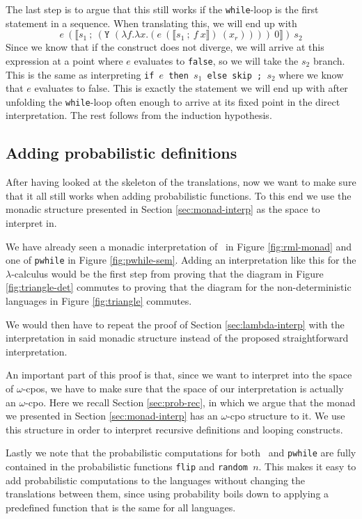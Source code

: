 \documentclass[11pt, leqno, titlepage]{article}
\theoremstyle{definition}
\begin{document}
The last step is to argue that this still works if the \texttt{while}-loop is the
first statement in a sequence. When translating this, we will end up with 
$$e~(\llbracket s_1~;~(\texttt{Y }(\lambda f.\lambda x.(e~(\llbracket
s_1~;~f~x\rrbracket) ~(x_r))))~0 \rrbracket) ~s_2 $$
Since we know that if the construct does not diverge, we will arrive at this
expression at a point where $e$ evaluates to \texttt{false}, so we will take the
$s_2$ branch. This is the same as interpreting \texttt{if $e$ then $s_1$ else skip ;
  $s_2$} where we know that $e$ evaluates to false. This is exactly the statement we
will end up with after unfolding the \texttt{while}-loop often enough to arrive at
its fixed point in the direct interpretation. The rest follows from the induction
hypothesis. 


\subsection{Adding probabilistic definitions}\label{sec:probab}
After having looked at the skeleton of the translations, now we want to make sure
that it all still works when adding probabilistic functions. To this end we use the
monadic structure  presented in Section \ref{sec:monad-interp} as the space to
interpret in.

We have already seen a monadic interpretation of \rml\ in Figure \ref{fig:rml-monad}
and one of \texttt{pwhile} in Figure \ref{fig:pwhile-sem}. Adding an interpretation
like this for the $\lambda$-calculus would be the first step from proving that the
diagram in Figure \ref{fig:triangle-det} commutes to proving that the diagram for the
non-deterministic languages in Figure \ref{fig:triangle} commutes.

We would then have to repeat the proof of Section \ref{sec:lambda-interp} with the
interpretation in said monadic structure instead of the proposed straightforward
interpretation.

An important part of this proof is that, since we want to interpret into the space of
$\omega$-cpos, we have to make sure that the space of our interpretation is actually
an $\omega$-cpo. Here we recall Section \ref{sec:prob-rec}, in which we argue that
the monad we presented in Section \ref{sec:monad-interp} has an $\omega$-cpo
structure to it. We use this structure in order to interpret recursive definitions
and looping constructs. 

Lastly we note that the probabilistic computations for both \rml\ and \texttt{pwhile}
are fully contained in the probabilistic functions \texttt{flip} and \texttt{random
  $n$}. This makes it easy to add probabilistic computations to the languages without
changing the translations between them, since using probability boils down to
applying a predefined function that is the same for all languages. 
\end{document}
